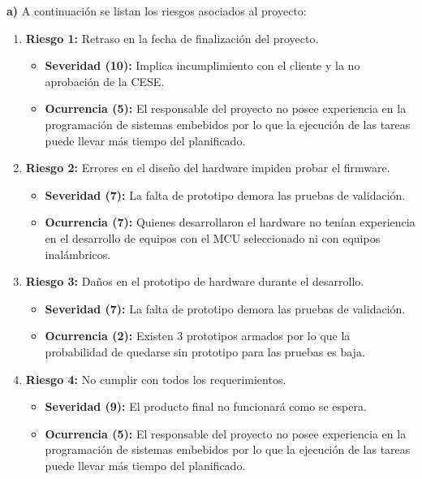 \documentclass[
11pt, %
codirector, %
]{charter}
\begin{document}
\textbf{a)} A continuación se listan los riesgos asociados al proyecto:

\begin{enumerate} 
	\item[] \textbf{Riesgo 1:} Retraso en la fecha de finalización del proyecto.
	\begin{itemize}
		\item \textbf{Severidad (10):} Implica incumplimiento con el cliente y la no aprobación de la CESE.
		\item \textbf{Ocurrencia (5):} El responsable del proyecto no posee experiencia en la programación de sistemas embebidos por lo que la ejecución de las tareas puede llevar más tiempo del planificado. 
	\end{itemize} 

	\item[] \textbf{Riesgo 2:} Errores en el diseño del hardware impiden probar el firmware.
	\begin{itemize}
		\item \textbf{Severidad (7):} La falta de prototipo demora las pruebas de validación.
		\item \textbf{Ocurrencia (7):} Quienes desarrollaron el hardware no tenían experiencia en el desarrollo de equipos con el MCU seleccionado ni con equipos inalámbricos.
	\end{itemize} 

	\item[] \textbf{Riesgo 3:} Daños en el prototipo de hardware durante el desarrollo.
	\begin{itemize}
		\item \textbf{Severidad (7):} La falta de prototipo demora las pruebas de validación.
		\item \textbf{Ocurrencia (2):} Existen 3 prototipos armados por lo que la probabilidad de quedarse sin prototipo para las pruebas es baja.
	\end{itemize} 

	\item[] \textbf{Riesgo 4:} No cumplir con todos los requerimientos.
	\begin{itemize}
		\item \textbf{Severidad (9):} El producto final no funcionará como se espera.
		\item \textbf{Ocurrencia (5):} El responsable del proyecto no posee experiencia en la programación de sistemas embebidos por lo que la ejecución de las tareas puede llevar más tiempo del planificado. 
	\end{itemize} 


\end{enumerate}
\end{document}
